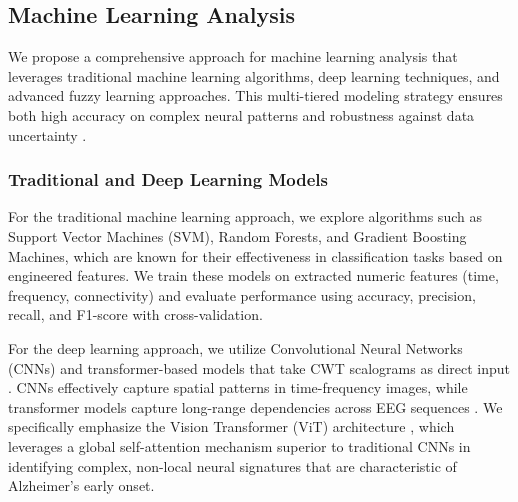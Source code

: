 \documentclass[openany]{book}
\begin{document}
\subsection{Machine Learning Analysis}
We propose a comprehensive approach for machine learning analysis that leverages traditional machine learning algorithms, deep learning techniques, and advanced fuzzy learning approaches. This multi-tiered modeling strategy ensures both high accuracy on complex neural patterns and robustness against data uncertainty \cite{oh2019deep, jang1993anfis}.

\subsubsection{Traditional and Deep Learning Models}
For the traditional machine learning approach, we explore algorithms such as Support Vector Machines (SVM), Random Forests, and Gradient Boosting Machines, which are known for their effectiveness in classification tasks based on engineered features. We train these models on extracted numeric features (time, frequency, connectivity) and evaluate performance using accuracy, precision, recall, and F1-score with cross-validation.

For the deep learning approach, we utilize Convolutional Neural Networks (CNNs) and transformer-based models that take CWT scalograms as direct input \cite{lawhern2018eegnet}. CNNs effectively capture spatial patterns in time-frequency images, while transformer models capture long-range dependencies across EEG sequences \cite{craik2019review}. We specifically emphasize the Vision Transformer (ViT) architecture \cite{dosovitskiy2021vit, song2022eegtransformer}, which leverages a global self-attention mechanism superior to traditional CNNs in identifying complex, non-local neural signatures that are characteristic of Alzheimer's early onset.
\end{document}
